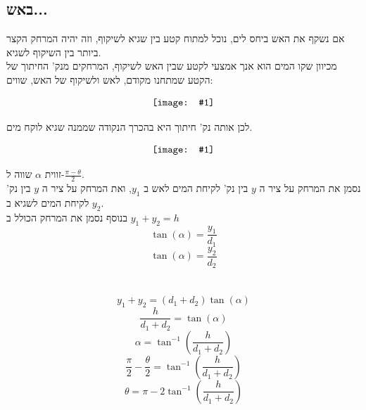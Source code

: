 \documentclass{article}
\newcommand{\image}[2]{
    \begin{align*}
        \centering
        \texttt{[image: \#1]}
    \end{align*}
}
\begin{document}
\newpage
\subsection*{באש...}
אם נשקף את האש ביחס לים, נוכל למתוח קטע בין שגיא לשיקוף, וזה יהיה המרחק הקצר ביותר בין השיקוף לשגיא.\\
מכיוון שקו המים הוא אנך אמצעי לקטע שבין האש לשיקוף, המרחקים מנק' החיתוך של הקטע שמתחנו מקודם, לאש ולשיקוף של האש, שווים:
\image{images/geogebra-export.png}{0.4}
לכן אותה נק' חיתוך היא בהכרך הנקודה שממנה שגיא לוקח מים.
\image{images/on_fire_figure_with_angles.png}{0.4}
זווית $\alpha$ שווה ל-$\frac{\pi - \theta}{2}$.\\
נסמן את המרחק על ציר ה
$y$ 
בין נק' לקיחת המים לאש ב
$y_1$,
ואת המרחק על ציר ה
$y$
בין נק' לקיחת המים לשגיא ב
$y_2$.\\
בנוסף נסמן את המרחק הכולל ב
$y_1+y_2 = h$
\begin{equation*}
    \tan (\alpha) = \frac{y_1}{d_1}
\end{equation*}
\begin{equation*}
    \tan (\alpha) = \frac{y_2}{d_2}
\end{equation*}
\\
\\
\begin{equation*}
    y_1 + y_2 = (d_1 + d_2)\tan (\alpha) 
\end{equation*}
\begin{equation*}
    \frac{h}{d_1 + d_2} = \tan (\alpha) 
\end{equation*}
\begin{equation*}
    \alpha = \tan ^ {-1} \left( \frac{h}{d_1 + d_2} \right)
\end{equation*}
\begin{equation*}
    \frac{\pi}{2} - \frac{\theta}{2} = \tan ^ {-1}\left( \frac{h}{d_1 + d_2} \right)
\end{equation*}
\begin{equation*}
    \theta = \pi - 2\tan ^ {-1} \left( \frac{h}{d_1 + d_2} \right)
\end{equation*}


\newpage
\end{document}
